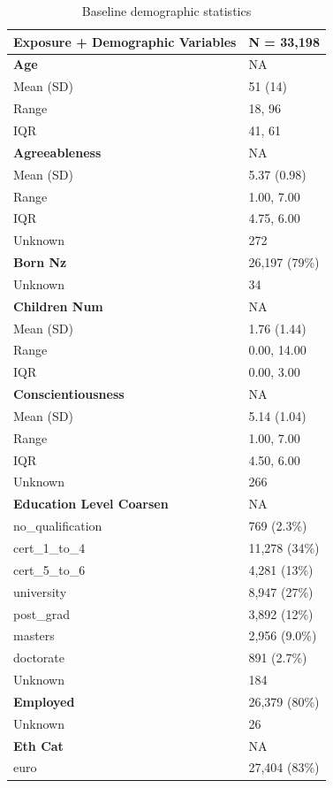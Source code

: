 \documentclass[
  single column]{article}
\begin{document}
\begin{longtable}[]{@{}ll@{}}

\caption{\label{tbl-table-demography}Baseline demographic statistics}

\tabularnewline

\toprule\noalign{}
\textbf{Exposure + Demographic Variables} & \textbf{N = 33,198} \\
\midrule\noalign{}
\endhead
\bottomrule\noalign{}
\endlastfoot
\textbf{Age} & NA \\
Mean (SD) & 51 (14) \\
Range & 18, 96 \\
IQR & 41, 61 \\
\textbf{Agreeableness} & NA \\
Mean (SD) & 5.37 (0.98) \\
Range & 1.00, 7.00 \\
IQR & 4.75, 6.00 \\
Unknown & 272 \\
\textbf{Born Nz} & 26,197 (79\%) \\
Unknown & 34 \\
\textbf{Children Num} & NA \\
Mean (SD) & 1.76 (1.44) \\
Range & 0.00, 14.00 \\
IQR & 0.00, 3.00 \\
\textbf{Conscientiousness} & NA \\
Mean (SD) & 5.14 (1.04) \\
Range & 1.00, 7.00 \\
IQR & 4.50, 6.00 \\
Unknown & 266 \\
\textbf{Education Level Coarsen} & NA \\
no\_qualification & 769 (2.3\%) \\
cert\_1\_to\_4 & 11,278 (34\%) \\
cert\_5\_to\_6 & 4,281 (13\%) \\
university & 8,947 (27\%) \\
post\_grad & 3,892 (12\%) \\
masters & 2,956 (9.0\%) \\
doctorate & 891 (2.7\%) \\
Unknown & 184 \\
\textbf{Employed} & 26,379 (80\%) \\
Unknown & 26 \\
\textbf{Eth Cat} & NA \\
euro & 27,404 (83\%) \\

\end{longtable}
\end{document}
